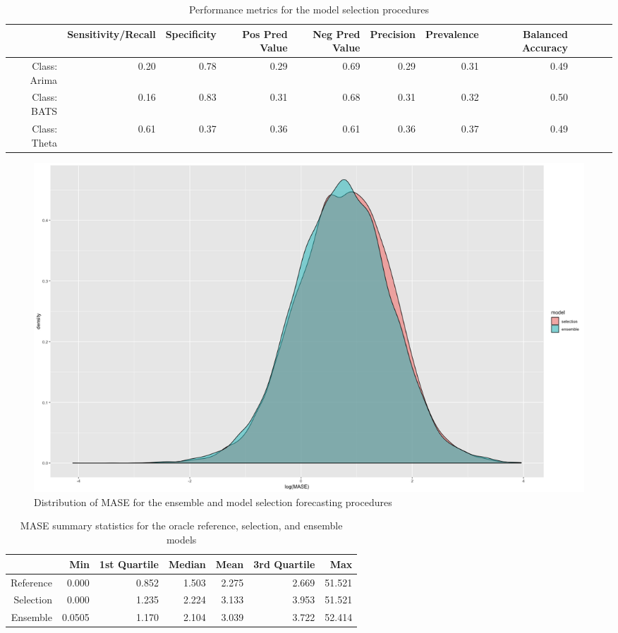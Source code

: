 \documentclass[11pt,3p,review,authoryear]{elsarticle}
\begin{document}
\begin{table}[ht]
\centering
\begin{adjustbox}{width=1\textwidth}
\begin{tabular}{rrrrrrrrrrrr}
  \hline
 & Sensitivity/Recall & Specificity & Pos Pred Value & Neg Pred Value & Precision & Prevalence &  Balanced Accuracy \\ 
  \hline
Class: Arima & 0.20 & 0.78 & 0.29 & 0.69 & 0.29 & 0.31 & 0.49 \\ 
  Class: BATS & 0.16 & 0.83 & 0.31 & 0.68 & 0.31 & 0.32 & 0.50 \\ 
  Class: Theta & 0.61 & 0.37 & 0.36 & 0.61 & 0.36 & 0.37 & 0.49 \\ 
   \hline
\end{tabular}
\end{adjustbox}
\caption{Performance metrics for the model selection procedures}\label{tab:a}
\end{table}

\begin{figure}[h]
\centering
\includegraphics[width=\textwidth]{distribution}
\caption{Distribution of MASE for the ensemble and model selection forecasting procedures}\label{fig:a}
\end{figure}

\begin{table}[ht]
\centering
{}
\begin{tabular}{rrrrrrr}
\hline
& Min & 1st Quartile & Median & Mean & 3rd Quartile & Max\\
\hline
Reference \vline & 0.000 & 0.852 & 1.503 & 2.275 & 2.669 & 51.521\\
Selection \vline & 0.000 & 1.235 & 2.224 & 3.133 & 3.953 & 51.521 \\
Ensemble \vline & 0.0505 & 1.170 & 2.104 & 3.039 & 3.722 & 52.414\\
\hline
\end{tabular}
\caption{MASE summary statistics for the oracle reference, selection, and ensemble models}\label{tab:c}
\end{table}
\end{document}

